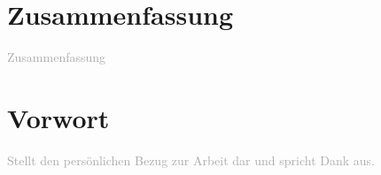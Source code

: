 \thispagestyle{empty}
\chapter*{Zusammenfassung}
\label{sec:Zusammenfassung}
\textcolor{darkgray}{
  Zusammenfassung
}

\chapter*{Vorwort}
\label{sec:Vorwort}

\textcolor{darkgray}{
  Stellt den persönlichen Bezug zur Arbeit dar und spricht Dank aus.
}
